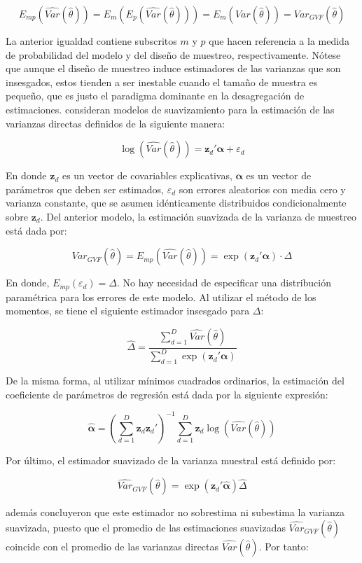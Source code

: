 \documentclass[
  12pt,
]{book}
\begin{document}
\[
E_{mp}\left(\widehat{Var}(\hat{\theta})\right) =
E_m\left(E_p\left(\widehat{Var}(\hat{\theta})\right)\right) =
E_m({Var}(\hat{\theta})) =
Var_{GVF}(\hat{\theta}) 
\]

La anterior igualdad contiene subscritos \(m\) y \(p\) que hacen referencia a la medida de probabilidad del modelo y del diseño de muestreo, respectivamente. Nótese que aunque el diseño de muestreo induce estimadores de las varianzas que son insesgados, estos tienden a ser inestable cuando el tamaño de muestra es pequeño, que es justo el paradigma dominante en la desagregación de estimaciones. \citet{Rivest_Belmonte_2000} consideran modelos de suavizamiento para la estimación de las varianzas directas definidos de la siguiente manera:

\[
\log(\widehat{Var}(\hat{\theta})) = \mathbf z_d' \boldsymbol \alpha + \varepsilon_d
\]

En donde \(\mathbf z_d\) es un vector de covariables explicativas, \(\boldsymbol \alpha\) es un vector de parámetros que deben ser estimados, \(\varepsilon_d\) son errores aleatorios con media cero y varianza constante, que se asumen idénticamente distribuidos condicionalmente sobre \(\mathbf z_d\). Del anterior modelo, la estimación suavizada de la varianza de muestreo está dada por:

\[
Var_{GVF}(\hat{\theta})  = E_{mp}(\widehat{Var}(\hat{\theta})) = \exp(\mathbf z_d' \boldsymbol \alpha) \cdot \Delta
\]

En donde, \(E_{mp}(\varepsilon_d) = \Delta\). No hay necesidad de especificar una distribución paramétrica para los errores de este modelo. Al utilizar el método de los momentos, se tiene el siguiente estimador insesgado para \(\Delta\):

\[
\hat\Delta = \frac{\sum_{d=1}^D \widehat{Var}(\hat{\theta})}{\sum_{d=1}^D \exp(\mathbf z_d' \boldsymbol \alpha)}
\]

De la misma forma, al utilizar mínimos cuadrados ordinarios, la estimación del coeficiente de parámetros de regresión está dada por la siguiente expresión:

\[
\hat{\boldsymbol \alpha} = \left(\sum_{d=1}^D \mathbf z_d \mathbf z_d' \right)^{-1} \sum_{d=1}^D \mathbf z_d \log(\widehat{Var}(\hat{\theta}))
\]

Por último, el estimador suavizado de la varianza muestral está definido por:

\[
\widehat{Var}_{GVF}(\hat{\theta}) = \exp(\mathbf z_d'\hat{\boldsymbol \alpha})\hat\Delta 
\]

\citet{Rivest_Belmonte_2000} además concluyeron que este estimador no sobrestima ni subestima la varianza suavizada, puesto que el promedio de las estimaciones suavizadas \(\widehat{Var}_{GVF}(\hat{\theta})\) coincide con el promedio de las varianzas directas \(\widehat{{Var}}(\hat{\theta})\). Por tanto:
\end{document}
